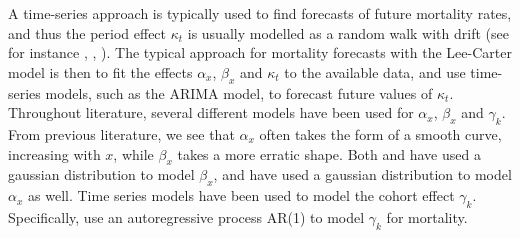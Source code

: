 \newpar
A time-series approach is typically used to find forecasts of future mortality rates, and thus the period effect $\kappa_t$ is usually modelled as a random walk with drift (see for instance \textcite{LeeCarter1992}, \textcite{Wisniowski2015}, \textcite{CZADO2005260}). The typical approach for mortality forecasts with the Lee-Carter model is then to fit the effects $\alpha_x$, $\beta_x$ and $\kappa_t$ to the available data, and use time-series models, such as the ARIMA model, to forecast future values of $\kappa_t$. Throughout literature, several different models have been used for $\alpha_x$, $\beta_x$ and $\gamma_k$. From previous literature, we see that $\alpha_x$ often takes the form of a smooth curve, increasing with $x$, while $\beta_x$ takes a more erratic shape. Both \textcite{CZADO2005260} and \textcite{Wisniowski2015} have used a gaussian distribution to model $\beta_x$, and \textcite{Wisniowski2015} have used a gaussian distribution to model $\alpha_x$ as well. Time series models have been used to model the cohort effect $\gamma_k$. Specifically, \textcite{Wisniowski2015} use an autoregressive process AR(1) to model $\gamma_k$ for mortality.

